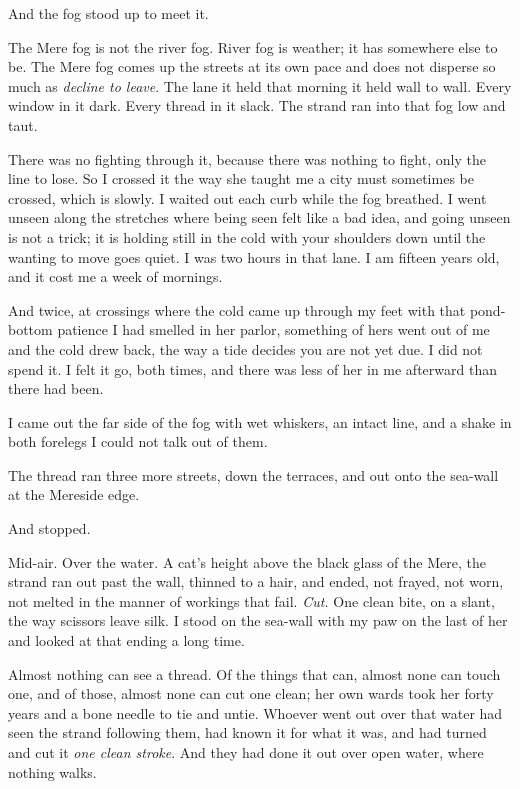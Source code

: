 And the fog stood up to meet it.

The Mere fog is not the river fog. River fog is weather; it has somewhere else to be. The Mere fog comes up the streets at its own pace and does not disperse so much as \emph{decline to leave}. The lane it held that morning it held wall to wall. Every window in it dark. Every thread in it slack. The strand ran into that fog low and taut.

There was no fighting through it, because there was nothing to fight, only the line to lose. So I crossed it the way she taught me a city must sometimes be crossed, which is slowly. I waited out each curb while the fog breathed. I went unseen along the stretches where being seen felt like a bad idea, and going unseen is not a trick; it is holding still in the cold with your shoulders down until the wanting to move goes quiet. I was two hours in that lane. I am fifteen years old, and it cost me a week of mornings.

And twice, at crossings where the cold came up through my feet with that pond-bottom patience I had smelled in her parlor, something of hers went out of me and the cold drew back, the way a tide decides you are not yet due. I did not spend it. I felt it go, both times, and there was less of her in me afterward than there had been.

I came out the far side of the fog with wet whiskers, an intact line, and a shake in both forelegs I could not talk out of them.

The thread ran three more streets, down the terraces, and out onto the sea-wall at the Mereside edge.

And stopped.

Mid-air. Over the water. A cat's height above the black glass of the Mere, the strand ran out past the wall, thinned to a hair, and ended, not frayed, not worn, not melted in the manner of workings that fail. \emph{Cut.} One clean bite, on a slant, the way scissors leave silk. I stood on the sea-wall with my paw on the last of her and looked at that ending a long time.

Almost nothing can see a thread. Of the things that can, almost none can touch one, and of those, almost none can cut one clean; her own wards took her forty years and a bone needle to tie and untie. Whoever went out over that water had seen the strand following them, had known it for what it was, and had turned and cut it \emph{one clean stroke}. And they had done it out over open water, where nothing walks.

